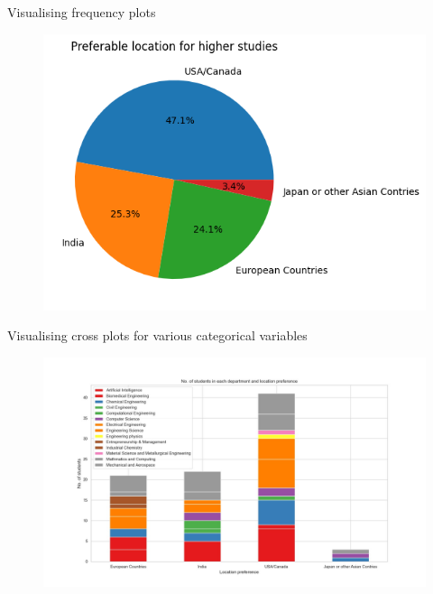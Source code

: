 \documentclass{beamer}
\begin{document}
\begin{frame}
  \begin{block}{Visualising frequency plots}
  \begin{figure}
  \centering
  \includegraphics[scale=0.7]{location.png}
  \label{fig:7}
  \end{figure}
  \end{block}
\end{frame}


\begin{frame}
  \begin{block}{Visualising cross plots for various categorical variables}
  \begin{figure}
  \centering
  \includegraphics[scale=0.22]{dept vs coun.jpg}
  \label{fig:12}
  \end{figure}
  \end{block}
\end{frame}
\end{document}
